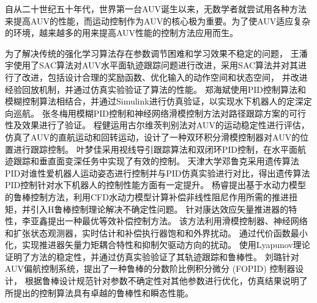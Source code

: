 自从二十世纪五十年代，世界第一台AUV诞生以来，无数学者就尝试用各种方法来提高AUV的性能，而运动控制作为AUV的核心极为重要。为了使AUV适应复杂的环境，越来越多的用来提高AUV性能的控制方法应用而生。

为了解决传统的强化学习算法存在参数调节困难和学习效果不稳定的问题，
王潘宇使用了SAC算法对AUV水平面轨迹跟踪问题进行改进，采用SAC算法并对其进行了改进，包括设计合理的奖励函数、优化输入的动作空间和状态空间，
并改进经验回放机制，并通过仿真实验验证了算法的性能\cite{ref1}。
郑海斌\cite{ref2}使用PID控制算法和模糊控制算法相结合，并通过Simulink进行仿真验证，以实现水下机器人的定深定向巡航。
张冬梅\cite{ref3}用模糊PID控制和神经网络滑模控制方法对路径跟踪方案的可行性及效果进行了验证。
程健\cite{ref4}运用古尔维茨判别法对AUV的运动稳定性进行评估，仿真了AUV的直航运动和回转运动，设计了一种双环积分滑模控制器对AUV的位置进行跟踪控制。
叶梦佳\cite{ref5}采用视线导引跟踪算法和双闭环PID控制，在水平面航迹跟踪和垂直面变深任务中实现了有效的控制。
天津大学邓鲁克采用遗传算法PID对谁性爱机器人运动姿态进行控制并与PID仿真实验进行对比，得出遗传算法PID控制针对水下机器人的控制性能方面有一定提升\cite{ref6}。
杨睿提出基于水动力模型的鲁棒控制方法，利用CFD水动力模型计算补偿非线性阻尼作用所需的推进扭矩，并引入H鲁棒控制理论解决不确定性问题\cite{ref7}。
针对康达效应矢量推进器的特性，李亚鑫\cite{ref8}提出一种最优等效补偿控制方法。
该方法利用滑模控制器、神经网络和扩张状态观测器，实时估计和补偿执行器饱和和外界扰动。
通过代价函数最小化，实现推进器矢量力矩耦合特性和抑制欠驱动方向的扰动。
使用Lyapunov理论证明了方法的稳定性，并通过仿真实验验证了其轨迹跟踪和鲁棒性。 
刘璐\cite{ref9}针对AUV偏航控制系统，提出了一种鲁棒的分数阶比例积分微分 (FOPID) 控制器设计，
根据鲁棒设计规范针对参数不确定性对其他参数进行优化，仿真结果说明了所提出的控制算法具有卓越的鲁棒性和瞬态性能。


